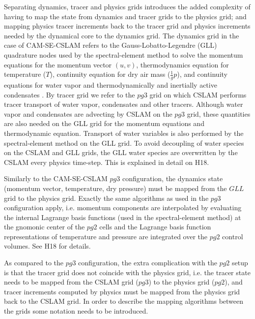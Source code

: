 Separating dynamics, tracer and physics grids introduces the added complexity of having to map the state from dynamics and tracer grids to the physics grid; and mapping physics tracer increments back to the tracer grid and physics increments needed by the dynamical core to the dynamics grid. The dynamics grid in the case of CAM-SE-CSLAM refers to the Gauss-Lobatto-Legendre (GLL) quadrature nodes used by the spectral-element method to solve the momentum equations for the momentum vector $(u,v)$, thermodynamics equation for temperature ($T$), continuity equation for dry air mass ($\frac{1}{g}p$), and continuity equations for water vapor and thermodynamically and inertially active condensates \citep[see, e.g., ][ for details]{LetAl2018JAMES}. By tracer grid we refer to the $pg3$ grid on which CSLAM performs tracer transport of water vapor, condensates and other tracers. Although water vapor and condensates are advecting by CSLAM on the $pg3$ grid, these quantities are also needed on the GLL grid for the momentum equations and thermodynamic equation. Transport of water variables is also performed by the spectral-element method on the GLL grid. To avoid decoupling of water species on the CSLAM and GLL grids, the GLL water species are overwritten by the CSLAM every physics time-step. This is explained in detail on H18.

Similarly to the CAM-SE-CSLAM $pg3$ configuration, the dynamics state (momentum vector, temperature, dry pressure) must be mapped from the $GLL$ grid to the physics grid. Exactly the same algorithms as used in the $pg3$ configuration apply, i.e. momentum components are interpolated by evaluating the internal Lagrange basis functions (used in the spectral-element method) at the gnomonic center of the $pg2$ cells and the Lagrange basis function representations of temperature and pressure are integrated over the $pg2$ control volumes. See H18 for details.

As compared to the $pg3$ configuration, the extra complication with the $pg2$ setup is that the tracer grid does not coincide with the physics grid, i.e. the tracer state needs to be mapped from the CSLAM grid ($pg3$) to the physics grid ($pg2$), and tracer increments computed by physics must be mapped from the physics grid back to the CSLAM grid. In order to describe the mapping algorithms between the grids some notation needs to be introduced.

